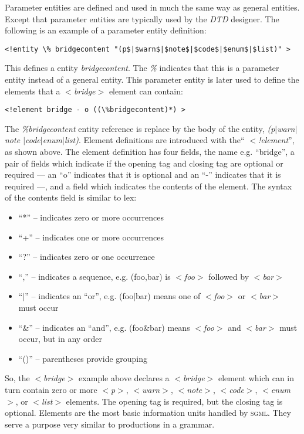 Parameter entities are defined and used in much the same way as general
entities. Except that parameter entities are typically used by the
\emph{DTD} designer. The following is an example of a parameter entity
definition:
\begin{verbatim}
<!entity \% bridgecontent "(p$|$warn$|$note$|$code$|$enum$|$list)" >
\end{verbatim}
\noindent
This defines a entity \textit{bridgecontent}. The \textit{\%} indicates that this is a
parameter entity instead of a general entity. This parameter entity is 
later used to define the elements that a \textit{$<$bridge$>$} element can contain:
\begin{verbatim}
<!element bridge - o ((\%bridgecontent)*) >
\end{verbatim}
\noindent
The \textit{\%bridgecontent} entity reference is replace by the body of the
entity, \textit{(p$|$warn$|$note $|$code$|$enum$|$list)}. Element definitions are 
introduced with the`` \textit{$<$!element}'', as shown above. The element definition
has four fields, the name e.g. ``bridge'', a pair of fields which indicate 
if the opening tag and closing tag are optional or required --- an ``o'' 
indicates that it is optional and an ``-'' indicates that it is required ---, 
and a field which indicates the contents of the element. The syntax of
the contents field is similar to lex:
\begin{itemize}
\item
``*'' -- indicates zero or more occurrences
\item
``+'' -- indicates one or more occurrences
\item
``?'' -- indicates zero or one occurrence
\item
``,'' -- indicates a sequence, e.g. (foo,bar) is \textit{$<$foo$>$} followed by
\textit{$<$bar$>$}
\item
``$|$'' -- indicates an ``or'', e.g. (foo$|$bar) means one of \textit{$<$foo$>$} or \textit{$<$bar$>$}
must occur
\item
``\&'' -- indicates an ``and'', e.g. (foo\&bar) means \textit{$<$foo$>$} and \textit{$<$bar$>$}
must occur, but in any order
\item
``()'' -- parentheses provide grouping
\end{itemize}
\noindent
So, the \textit{$<$bridge$>$} example above declares a \textit{$<$bridge$>$} element which can in 
turn contain zero or more \textit{$<$p$>$}, \textit{$<$warn$>$}, \textit{$<$note$>$}, \textit{$<$code$>$}, \textit{$<$enum$>$}, 
or \textit{$<$list$>$} elements. The opening tag is required, but the closing tag is
optional. Elements are the most basic information units handled by \textsc{sgml}.
They serve a purpose very similar to productions in a grammar.


